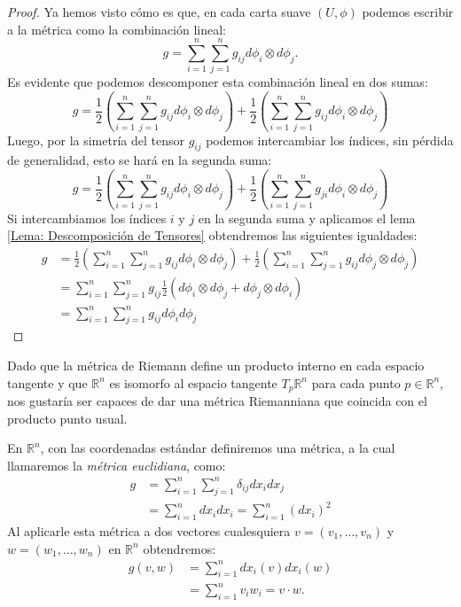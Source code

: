 \begin{proof}
	Ya hemos visto cómo es que, en cada carta suave $(U,\phi)$ podemos escribir a la métrica como la combinación lineal:
	\[
		g = \sum_{i=1}^{n}\sum_{j=1}^{n} g_{ij} d\phi_{i} \otimes d\phi_j.
	\]
	Es evidente que podemos descomponer esta combinación lineal en dos sumas:
	\[
		g = \frac{1}{2}\left(\sum_{i=1}^{n}\sum_{j=1}^{n} g_{ij} d\phi_{i} \otimes d\phi_j \right)
		+ \frac{1}{2}\left(\sum_{i=1}^{n}\sum_{j=1}^{n} g_{ij} d\phi_{i} \otimes d\phi_j \right)
	\]
	Luego, por la simetría del tensor $g_{ij}$ podemos intercambiar los índices, sin pérdida de generalidad, esto se hará en la segunda suma:
	\[
		g = \frac{1}{2}\left(\sum_{i=1}^{n}\sum_{j=1}^{n} g_{ij} d\phi_{i} \otimes d\phi_j \right)
		+ \frac{1}{2}\left(\sum_{i=1}^{n}\sum_{j=1}^{n} g_{ji} d\phi_{i} \otimes d\phi_j \right)
	\]
	Si intercambiamos los índices $i$ y $j$ en la segunda suma y aplicamos el lema \ref{Lema: Descomposición de Tensores} obtendremos las siguientes igualdades:
	\begin{align*}
		g & = \frac{1}{2}\left(\sum_{i=1}^{n}\sum_{j=1}^{n} g_{ij} d\phi_{i} \otimes d\phi_{j} \right)
		+
		\frac{1}{2}\left(\sum_{i=1}^{n}\sum_{j=1}^{n} g_{ij} d\phi_{j} \otimes d\phi_{j} \right)                                      \\
		  & = \sum_{i=1}^{n}\sum_{j=1}^{n} g_{ij} \frac{1}{2} \left( d\phi_{i} \otimes d\phi_{j} + d\phi_{j} \otimes d\phi_{i}\right) \\
		  & = \sum_{i=1}^{n}\sum_{j=1}^{n} g_{ij} d\phi_{i}  d\phi_{j}
	\end{align*}
\end{proof}


\begin{example}
	Dado que la métrica de Riemann define un producto interno en cada espacio tangente y que $\mathbb{R}^{n}$ es isomorfo al espacio tangente $T_{p}\mathbb{R}^{n}$ para cada punto $p \in \mathbb{R}^{n}$, nos gustaría ser capaces de dar una métrica Riemanniana que coincida con el producto punto usual.

	En $\mathbb{R}^{n}$, con las coordenadas estándar definiremos una métrica, a la cual llamaremos la \textit{métrica euclidiana}, como:
	\begin{align*}
		g & = \sum_{i=1}^{n} \sum_{j=1}^{n} \delta_{ij}dx_{i}dx_{j}     \\
		  & = \sum_{i=1}^{n} dx_{i}dx_{i} = \sum_{i=1}^{n} (dx_{i})^{2}
	\end{align*}
	Al aplicarle esta métrica a dos vectores cualesquiera $v = (v_1, \ldots, v_n)$ y $w = (w_1, \ldots, w_n)$ en $\mathbb{R}^{n}$ obtendremos:
	\begin{align*}
		g(v,w) & = \sum_{i=1}^{n} dx_{i}(v)dx_{i}(w)   \\
		       & = \sum_{i=1}^{n} v_i w_i = v \cdot w.
	\end{align*}
\end{example}

